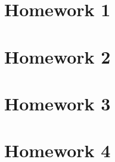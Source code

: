 



\maketitle
\partition
\section*{Homework 1}

\partition
\section*{Homework 2}

\partition
\section*{Homework 3}

\partition
\section*{Homework 4}

